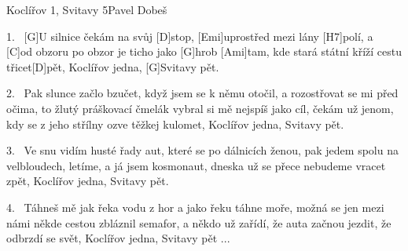 \begin{song}{Koclířov 1, Svitavy 5}{Pavel Dobeš}

\begin{xverse}{1.~}
[\large G]U silnice čekám na svůj [\large D]stop,
[\large Emi]uprostřed mezi lány [\large H7]polí,
a [\large C]od obzoru po obzor je ticho jako [\large G]hrob
[\large Ami]tam, kde stará státní kříží cestu třicet[\large D]pět,
Koclířov jedna, [\large G]Svitavy pět.
\end{xverse}

\begin{xverse}{2.~}
Pak slunce začlo bzučet, když jsem se k němu otočil,
a rozostřovat se mi před očima,
to žlutý práškovací čmelák vybral si mě nejspíš jako cíl,
čekám už jenom, kdy se z jeho střílny ozve těžkej kulomet,
Koclířov jedna, Svitavy pět.
\end{xverse}

\begin{xverse}{3.~}
Ve snu vidím husté řady aut,
které se po dálnicích ženou,
pak jedem spolu na velbloudech, letíme, a já jsem kosmonaut,
dneska už se přece nebudeme vracet zpět,
Koclířov jedna, Svitavy pět.
\end{xverse}

\begin{xverse}{4.~}
Táhneš mě jak řeka vodu z hor
a jako řeku táhne moře,
možná se jen mezi námi někde cestou zbláznil semafor,
a někdo už zařídí, že auta začnou jezdit, že odbrzdí se svět,
Koclířov jedna, Svitavy pět ...
\end{xverse}
\end{song}



